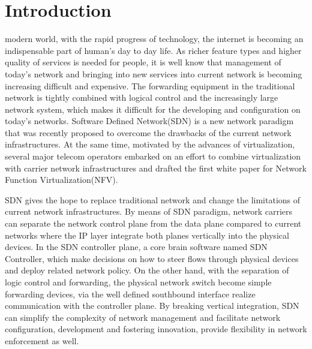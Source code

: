 \documentclass{ieeeaccess}
\begin{document}
\titlepgskip=-15pt
\maketitle

\section{Introduction}
\label{sec:introduction}
 modern world, with the rapid progress of technology, the internet is becoming an indispensable part of human’s day to day life. As richer feature types and higher quality of services is needed for people, it is well know that management of today’s network and bringing into new services into current network is becoming increasing difficult and expensive. The forwarding equipment in the traditional network is tightly combined with logical control and the increasingly large network system, which makes it difficult for the developing and configuration on today’s networks. Software Defined Network(SDN)\cite{b1} is a new network paradigm that was recently proposed to overcome the drawbacks of the current network infrastructures. At the same time, motivated by the advances of virtualization, several major telecom operators embarked on an effort to combine virtualization with carrier network infrastructures and drafted  the first white paper for Network Function Virtualization(NFV)\cite{b2}.

SDN gives the hope to replace traditional network and change the limitations of current network infrastructures. By means of SDN paradigm, network carriers can separate the network control plane from the data plane compared to current networks where the IP layer integrate both planes vertically into the physical devices. In the SDN controller plane, a core brain software named SDN Controller, which make decisions on how to steer flows through physical devices and deploy related network policy. On the other hand, with the separation of logic control and forwarding, the physical network switch become simple forwarding devices, via the well defined southbound interface realize communication with the controller plane\cite{b3}. By breaking vertical integration, SDN can simplify the complexity of network management and facilitate network configuration, development and fostering innovation, provide flexibility in network enforcement as well\cite{b3}.
\end{document}

